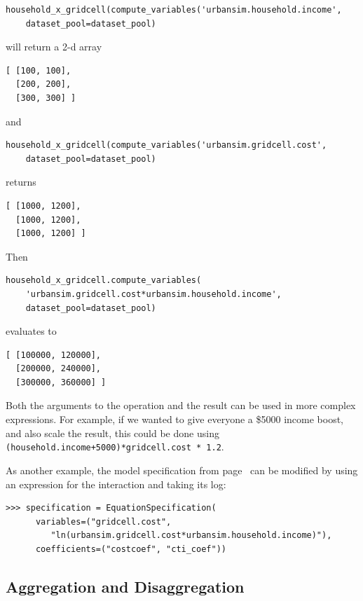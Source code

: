\begin{verbatim}
household_x_gridcell(compute_variables('urbansim.household.income',
    dataset_pool=dataset_pool)
\end{verbatim}

will return a 2-d array

\begin{verbatim}
[ [100, 100],
  [200, 200],
  [300, 300] ]
\end{verbatim}

and

\begin{verbatim}
household_x_gridcell(compute_variables('urbansim.gridcell.cost',
    dataset_pool=dataset_pool)
\end{verbatim}

returns

\begin{verbatim}
[ [1000, 1200],
  [1000, 1200],
  [1000, 1200] ]
\end{verbatim}

Then
\begin{verbatim}
household_x_gridcell.compute_variables(
    'urbansim.gridcell.cost*urbansim.household.income',
    dataset_pool=dataset_pool)
\end{verbatim}

evaluates to
\begin{verbatim}
[ [100000, 120000],
  [200000, 240000],
  [300000, 360000] ]
\end{verbatim}

Both the arguments to the operation and the result can be used in more
complex expressions.  For example, if we wanted to give everyone
a \$5000 income boost, and also scale the result, this could be done using
\verb|(household.income+5000)*gridcell.cost * 1.2|.

As another example, the model specification from
page~\pageref{page:iv-spec} can be modified by using an expression for the
interaction and taking its log: \variablesindex \coefficientsindex

\begin{verbatim}
>>> specification = EquationSpecification(
      variables=("gridcell.cost",
         "ln(urbansim.gridcell.cost*urbansim.household.income)"),
      coefficients=("costcoef", "cti_coef"))
\end{verbatim}


\subsection{Aggregation and Disaggregation}
\label{sec:aggregation}
 

